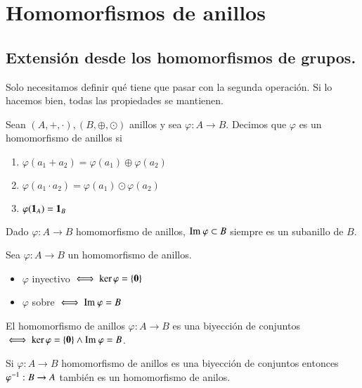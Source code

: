 
\chapter{Homomorfismos de anillos}

\section{Extensión desde los homomorfismos de grupos.}

Solo necesitamos definir qué tiene que pasar con la segunda operación. Si lo hacemos bien, todas las propiedades se mantienen.

\begin{dfn}
	Sean $(A, +, \cdot), (B, \oplus, \odot)$ anillos y sea $\varphi: A \to B$. Decimos que $\varphi$ es un homomorfismo de anillos si
	\begin{enumerate}
		\item $\varphi(a_1+a_2) = \varphi(a_1) \oplus \varphi(a_2)$
		\item $\varphi(a_1 \cdot a_2) = \varphi(a_1)\odot\varphi(a_2)$
		\item $\varphi(\mathbf{1}_A) = \mathbf{1}_B$
	\end{enumerate}
\end{dfn}

\begin{obs}
	Dado $\varphi:A \to B$ homomorfismo de anillos, $\text{Im } \varphi \subset B$ siempre es un subanillo de $B$.
\end{obs}

\begin{pro}
	Sea $\varphi: A \to B$ un homomorfismo de anillos.
	\begin{itemize}
		\item $\varphi$ inyectivo $\iff \ker \varphi = \{\mathbf{0}\}$
		\item $\varphi$ sobre $\iff \text{Im } \varphi = B$
	\end{itemize}
\end{pro}

\begin{pro}
	El homomorfismo de anillos $\varphi: A \to B$ es una biyección de conjuntos $\iff \ker \varphi = \{\mathbf{0}\} \land \text{Im } \varphi = B$.
\end{pro}

\begin{obs}
	Si $\varphi:A \to B$ homomorfismo de anillos es una biyección de conjuntos entonces $\varphi^{-1}:B \to A$ también es un homomorfismo de anilos.
\end{obs}

